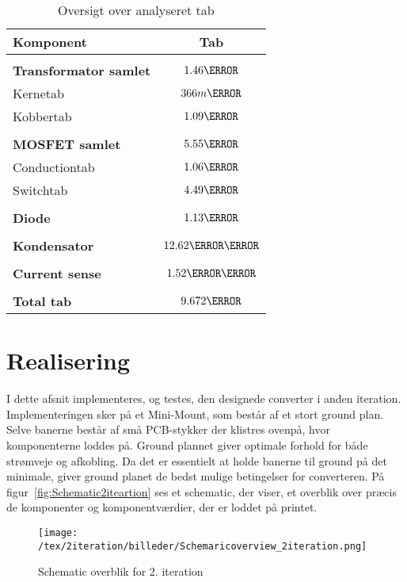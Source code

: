 \begin{table}[H] 			
	\centering
	\begin{tabularx}{\textwidth}{|X|c|}
		\hline
		\textbf{\large Komponent} & {\textbf{\large Tab}} \\ \hline
		& 	\\ \hline
		\textbf{Transformator samlet} & $1.46\watt$ \\ \hline 
		Kernetab & $366m\watt$ \\ \hline
		Kobbertab & $1.09\watt$ \\ \hline
		& 	\\ \hline
		\textbf{MOSFET samlet} & $5.55\watt$ \\ \hline
		Conductiontab & $1.06\watt$ \\ \hline
		Switchtab & $4.49\watt$ \\ \hline
		& 	\\ \hline
		\textbf{Diode} & $1.13\watt$ \\ \hline
		& 	\\ \hline
		\textbf{Kondensator} & $12.62\milli\watt$ \\ \hline
		& 	\\ \hline
			\textbf{Current sense} & $1.52\milli\watt$ \\ \hline
		& 	\\ \hline
		\textbf{Total tab} & $9.672\watt$ \\ \hline
	\end{tabularx}
	\caption{Oversigt over analyseret tab}
	\label{tab:analyseret}
\end{table}



\clearpage 

\section{Realisering}
I dette afsnit implementeres, og testes, den designede converter i anden iteration. Implementeringen sker på et Mini-Mount, som består af et stort ground plan. Selve banerne består af små PCB-stykker der klistres ovenpå, hvor komponenterne loddes på. Ground plannet giver optimale forhold for både strømveje og afkobling. Da det er essentielt at holde banerne til ground på det minimale, giver ground planet de bedst mulige betingelser for converteren. På figur~\ref{fig:Schematic2iteartion} ses et schematic, der viser, et overblik over præcis de komponenter og komponentværdier, der er loddet på printet.
\begin{figure}[H]
	\center
	\texttt{[image: /tex/2iteration/billeder/Schemaricoverview\_2iteration.png]}
	\caption{Schematic overblik for 2. iteration}
	\label{fig:Schematic2iteration}
\end{figure}

